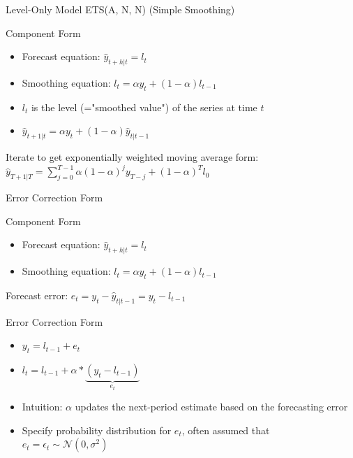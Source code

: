 \documentclass{beamer}
\begin{document}
\begin{frame}{Level-Only Model ETS(A, N, N) (Simple Smoothing)}
  \begin{block}{Component Form}
    \begin{itemize}
    \item Forecast equation: $\hat{y}_{t+h |t} = l_t$
    \item Smoothing equation: $l_t = \alpha y_t + (1-\alpha)l_{t-1}$
    \end{itemize}
  \end{block}

  \begin{itemize}
  \item $l_t$ is the level (="smoothed value") of the series at time $t$
  \item $\hat{y}_{t+1|t} = \alpha y_t + (1 - \alpha)\hat{y}_{t|t-1}$
  \end{itemize}
  Iterate to get exponentially weighted moving average form: $\hat{y}_{T+1|T} = \sum_{j=0}^{T-1}\alpha(1-\alpha)^j y_{T-j} + (1-\alpha)^Tl_0$  
\end{frame}

\begin{frame}{Error Correction Form}
  \begin{exampleblock}{Component Form}
    \begin{itemize}
    \item Forecast equation: $\hat{y}_{t+h |t} = l_t$
    \item Smoothing equation: $l_t = \alpha y_t + (1-\alpha)l_{t-1}$
    \end{itemize}
  \end{exampleblock}

  Forecast error: $e_t = y_t - \hat{y}_{t|t-1} = y_t - l_{t-1}$
  
  \begin{block}{Error Correction Form}
    \begin{itemize}
    \item $y_t = l_{t-1} + e_t$
    \item $l_t = l_{t-1} + \alpha*\underbrace{(y_t - l_{t-1})}_{e_t}$
    \end{itemize}

    \begin{itemize}
    \item Intuition: $\alpha$ updates the next-period estimate based on the forecasting error
    \item Specify probability distribution for $e_t$, often assumed that $e_t = \epsilon_t \sim \mathcal{N}(0, \sigma^2)$
    \end{itemize}
           
  \end{block}
  
\end{frame}
\end{document}
